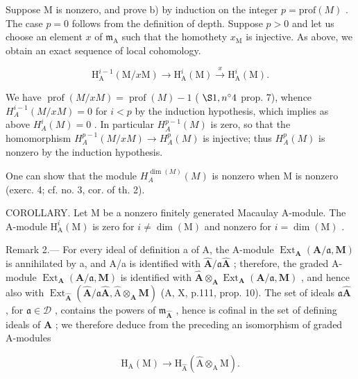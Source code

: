 Suppose M is nonzero, and prove b) by induction on the integer \(p = \text{prof}(M)\) . The case \(p = 0\) follows from the definition of depth. Suppose \(p > 0\) and let us choose an element \(x\) of \(\mathfrak{m}_{\mathrm{A}}\) such that the homothety \(x_{\mathrm{M}}\) is injective. As above, we obtain an exact sequence of local cohomology.

\[
\mathrm{H} _ {\mathrm{A}} ^ {i - 1} (\mathrm{M} / x \mathrm{M}) \longrightarrow \mathrm{H} _ {\mathrm{A}} ^ {i} (\mathrm{M}) \xrightarrow {x} \mathrm{H} _ {\mathrm{A}} ^ {i} (\mathrm{M}).
\]

We have \(\operatorname{prof}(M/xM) = \operatorname{prof}(M) - 1\) ( \(\S 1, n^{\circ} 4\) prop. 7), whence \(H_{A}^{i-1}(M/xM) = 0\) for \(i < p\) by the induction hypothesis, which implies as above \(H_{A}^{i}(M) = 0\) . In particular \(H_{A}^{p-1}(M)\) is zero, so that the homomorphism \(H_{A}^{p-1}(M/xM) \longrightarrow H_{A}^{p}(M)\) is injective; thus \(H_{A}^{p}(M)\) is nonzero by the induction hypothesis.

One can show that the module \(H_{A}^{\dim(M)}(M)\) is nonzero when M is nonzero (exerc. 4; cf. no. 3, cor. of th. 2).

COROLLARY. Let M be a nonzero finitely generated Macaulay A-module. The A-module \(\mathrm{H}_{\mathrm{A}}^{i}(\mathrm{M})\) is zero for \(i \neq \dim(\mathrm{M})\) and nonzero for \(i = \dim(\mathrm{M})\) .

Remark 2.--- For every ideal of definition a of A, the A-module \(\operatorname{Ext}_{\mathbf{A}}(\mathbf{A}/\mathfrak{a},\mathbf{M})\) is annihilated by a, and A/a is identified with \(\widehat{\mathbf{A}}/\mathfrak{a}\widehat{\mathbf{A}}\) ; therefore, the graded A-module \(\operatorname{Ext}_{\mathbf{A}}(\mathbf{A}/\mathfrak{a},\mathbf{M})\) is identified with \(\widehat{\mathbf{A}}\otimes_{\mathbf{A}}\operatorname{Ext}_{\mathbf{A}}(\mathbf{A}/\mathfrak{a},\mathbf{M})\) , and hence also with \(\operatorname{Ext}_{\widehat{\mathbf{A}}}(\widehat{\mathbf{A}}/\mathfrak{a}\widehat{\mathbf{A}},\widehat{\mathrm{A}}\otimes_{\mathbf{A}}\mathbf{M})\) (A, X, p.111, prop. 10). The set of ideals \(\mathfrak{a}\widehat{\mathbf{A}}\) , for \(\mathfrak{a}\in\mathcal{D}\) , contains the powers of \(\mathfrak{m}_{\widehat{\mathbf{A}}}\) , hence is cofinal in the set of defining ideals of \(\widehat{\mathbf{A}}\) ; we therefore deduce from the preceding an isomorphism of graded A-modules

\[
\mathrm{H} _ {\mathrm{A}} (\mathrm{M}) \longrightarrow \mathrm{H} _ {\widehat {\mathrm{A}}} (\widehat {\mathrm{A}} \otimes_ {\mathrm{A}} \mathrm{M}).
\]

